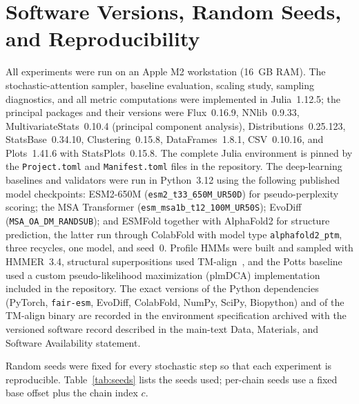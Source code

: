 \section{Software Versions, Random Seeds, and Reproducibility}\label{si:reproducibility}

All experiments were run on an Apple M2 workstation (16~GB RAM). The stochastic-attention sampler, baseline evaluation, scaling study, sampling diagnostics, and all metric computations were implemented in Julia~1.12.5; the principal packages and their versions were Flux~0.16.9, NNlib~0.9.33, MultivariateStats~0.10.4 (principal component analysis), Distributions~0.25.123, StatsBase~0.34.10, Clustering~0.15.8, DataFrames~1.8.1, CSV~0.10.16, and Plots~1.41.6 with StatsPlots~0.15.8. The complete Julia environment is pinned by the \texttt{Project.toml} and \texttt{Manifest.toml} files in the repository. The deep-learning baselines and validators were run in Python~3.12 using the following published model checkpoints: ESM2-650M (\texttt{esm2\_t33\_650M\_UR50D}) for pseudo-perplexity scoring; the MSA Transformer (\texttt{esm\_msa1b\_t12\_100M\_UR50S}); EvoDiff (\texttt{MSA\_OA\_DM\_RANDSUB}); and ESMFold together with AlphaFold2 for structure prediction, the latter run through ColabFold with model type \texttt{alphafold2\_ptm}, three recycles, one model, and seed~0. Profile HMMs were built and sampled with HMMER~3.4, structural superpositions used TM-align~\cite{zhangTMalign2005}, and the Potts baseline used a custom pseudo-likelihood maximization (plmDCA) implementation included in the repository. The exact versions of the Python dependencies (PyTorch, \texttt{fair-esm}, EvoDiff, ColabFold, NumPy, SciPy, Biopython) and of the TM-align binary are recorded in the environment specification archived with the versioned software record described in the main-text Data, Materials, and Software Availability statement.

Random seeds were fixed for every stochastic step so that each experiment is reproducible. Table~\ref{tab:seeds} lists the seeds used; per-chain seeds use a fixed base offset plus the chain index $c$.

